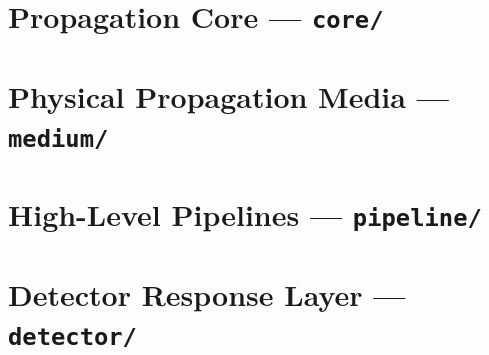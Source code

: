 \documentclass[11pt,a4paper,openany]{report}
\begin{document}
\part{Propagation Core --- \texttt{core/}}






\part{Physical Propagation Media --- \texttt{medium/}}





\part{High-Level Pipelines --- \texttt{pipeline/}}






\part{Detector Response Layer --- \texttt{detector/}}







\clearpage
\printbibliography[title={References}]
\end{document}
